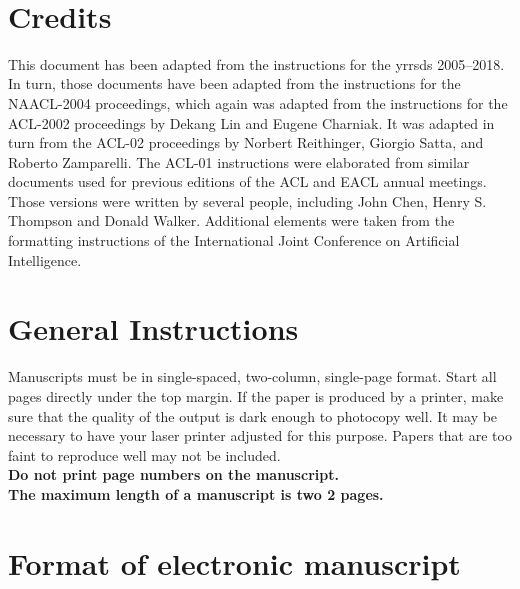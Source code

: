 \documentclass[10pt, a4paper]{article}
\begin{document}

{}\\[1cm]

\section{Credits}
\label{sec:credits}

This document has been adapted from the instructions for the \ac{yrrsds} 2005--2018.
In turn, those documents have been adapted from the instructions for the NAACL-2004 proceedings, which again was adapted from the instructions for the ACL-2002 proceedings by Dekang Lin and Eugene Charniak.
It was adapted in turn from the ACL-02 proceedings by Norbert Reithinger, Giorgio Satta, and Roberto Zamparelli.
The ACL-01 instructions were elaborated from similar documents used for previous editions of the ACL and EACL annual meetings.
Those versions were written by several people, including John Chen, Henry S. Thompson and Donald Walker.
Additional elements were taken from the formatting instructions of the International Joint Conference on Artificial Intelligence.

\section{General Instructions}
\label{sec:general_instructions}

Manuscripts must be in single-spaced, two-column, single-page format.
Start all pages directly under the top margin.
If the paper is produced by a printer, make sure that the quality of the output
is dark enough to photocopy well. It may be necessary to have your laser
printer adjusted for this purpose. Papers that are too faint to reproduce well
may not be included.\\
\textbf{Do not print page numbers on the manuscript.}\\
\textbf{The maximum length of a manuscript is two 2 pages.}

\section{Format of electronic manuscript}
\label{sec:format_of_electronic_manusript}
\end{document}
